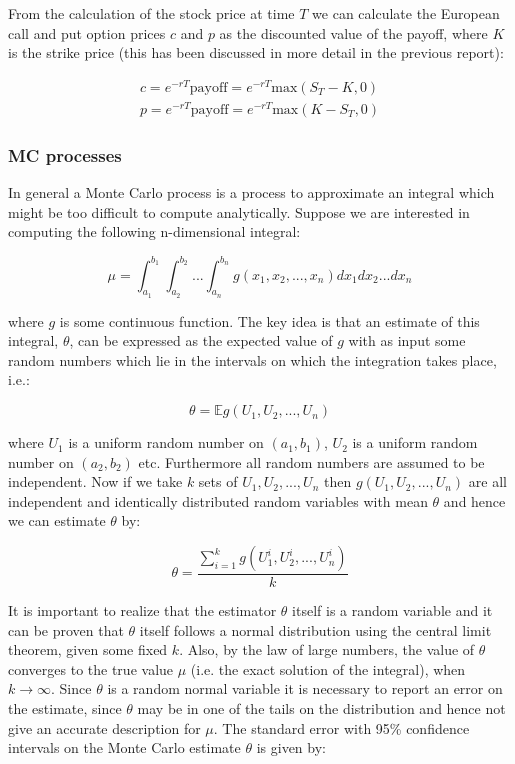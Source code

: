 \documentclass[11pt,a4paper]{article}
\begin{document}
From the calculation of the stock price at time $T$ we can calculate the European call and put option prices $c$ and $p$ as the discounted value of the payoff, where $K$ is the strike price (this has been discussed in more detail in the previous report):

\begin{align}
  \label{eq:optionval}
  c = e^{-rT}\text{payoff} = e^{-rT}\text{max}(S_T - K,0) \nonumber \\
  p = e^{-rT}\text{payoff} = e^{-rT}\text{max}(K - S_T,0)
\end{align}

\subsubsection{MC processes}
In general a Monte Carlo process is a process to approximate an integral which might be too difficult to compute analytically. Suppose we are interested in computing the following n-dimensional integral:

\begin{equation}
  \mu = \int_{a_1}^{b_1} \int_{a_2}^{b_2} ... \int_{a_n}^{b_n} g(x_1,x_2,...,x_n) dx_1 dx_2 ... dx_n
\end{equation}

where $g$ is some continuous function. The key idea is that an estimate of this integral, $\theta$, can be expressed as the expected value of $g$ with as input some random numbers which lie in the intervals on which the integration takes place, i.e.:

\begin{equation}
  \theta = \mathbb{E}g(U_1,U_2,...,U_n)
\end{equation}

where $U_1$ is a uniform random number on $(a_1,b_1)$, $U_2$ is a uniform random number on $(a_2,b_2)$ etc. Furthermore all random numbers are assumed to be independent. Now if we take $k$ sets of ${U_1,U_2,...,U_n}$ then $g(U_1,U_2,...,U_n)$ are all independent and identically distributed random variables with mean $\theta$ and hence we can estimate $\theta$ by:

\begin{equation}
  \theta = \frac{\sum_{i=1}^k g(U_1^i,U_2^i,...,U_n^i)}{k}
\end{equation}

It is important to realize that the estimator $\theta$ itself is a random variable and it can be proven that $\theta$ itself follows a normal distribution using the central limit theorem, given some fixed $k$. Also, by the law of large numbers, the value of $\theta$ converges to the true value $\mu$ (i.e. the exact solution of the integral), when $k \rightarrow \infty$. Since $\theta$ is a random normal variable it is necessary to report an error on the estimate, since $\theta$ may be in one of the tails on the distribution and hence not give an accurate description for $\mu$. The standard error with 95\% confidence intervals on the Monte Carlo estimate $\theta$ is given by:
\end{document}
